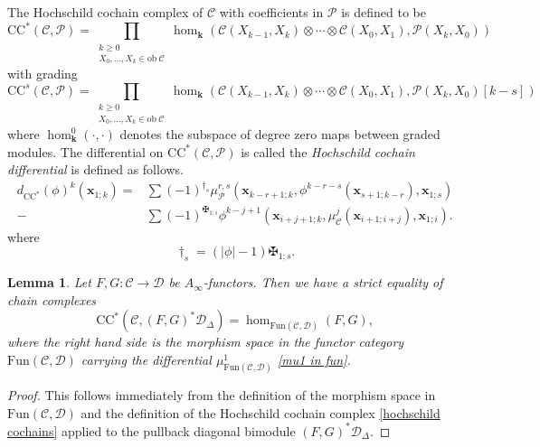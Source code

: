 \documentclass[11pt]{amsproc}
\def\K{{\mathbf{k}}}
\def\cP{\mathcal{P}}
\def\cc{\mathcal{C}}
\def\dd{\mathcal{D}}
\def\r#1{\mathrm{#1}}
\def\D{\Delta}
\def\ainf{A_\infty}
\def\ob{\mathrm{ob\ }}
\def\fun{\mathrm{Fun}}
\newtheorem{lem}{Lemma}[section]
\theoremstyle{remark}
\numberwithin{equation}{section}
\begin{document}
The Hochschild cochain complex of $\cc$ with coefficients in $\cP$ is defined to be
\begin{equation}\label{hochschild cochains}
\r{CC}^{*}(\cc, \cP) = \prod_{\substack{k \ge 0\\X_{0}, \ldots, X_{k} \in \ob \cc}} \hom_{\K}(\cc(X_{k-1}, X_{k}) \otimes \cdots \otimes \cc(X_{0}, X_{1}), \cP(X_{k}, X_{0}))
\end{equation}
with grading
\begin{equation}
\r{CC}^{s}(\cc, \cP) = \prod_{\substack{k \ge 0\\X_{0}, \ldots, X_{k} \in \ob \cc}} \hom_{\K}(\cc(X_{k-1}, X_{k}) \otimes \cdots \otimes \cc(X_{0}, X_{1}), \cP(X_{k}, X_{0})[k-s])
\end{equation}
where $\hom^{0}_{\K}(\cdot, \cdot)$ denotes the subspace of degree zero maps between graded modules.
The differential on $\r{CC}^{*}(\cc, \cP)$ is called the {\it Hochschild cochain differential} is defined as follows.
\begin{equation}\label{hochschild cochain differential}
\begin{split}
d_{\r{CC}^{*}}(\phi)^{k}(\mathbf{x}_{1; k}) = & \sum (-1)^{\dagger_{s}} \mu_{\cP}^{r, s}(\mathbf{x}_{k-r+1; k}, \phi^{k-r-s}(\mathbf{x}_{s+1; k-r}), \mathbf{x}_{1;s}) \\
- & \sum (-1)^{\maltese_{1;i}} \phi^{k-j+1}(\mathbf{x}_{i+j+1; k}, \mu_{\cc}^{j}(\mathbf{x}_{i+1; i+j}), \mathbf{x}_{1; i}).
\end{split}
\end{equation}
where 
\begin{equation}
\dagger_{s} = (|\phi|-1)\maltese_{1; s}.
\end{equation}

\begin{lem}\label{lem: cc computes hom in fun}
Let $F, G: \cc \to \dd$ be $\ainf$-functors. Then we have a strict equality of chain complexes
\begin{equation}
\r{CC}^{*}(\cc, (F, G)^{*}\dd_{\D}) = \hom_{\fun(\cc, \dd)}(F, G),
\end{equation}
where the right hand side is the morphism space in the functor category $\fun(\cc, \dd)$ carrying the differential $\mu^{1}_{\fun(\cc, \dd)}$ \eqref{mu1 in fun}.
\end{lem}
\begin{proof}
This follows immediately from the definition of the morphism space in $\fun(\cc, \dd)$ and the definition of the Hochschild cochain complex \eqref{hochschild cochains} applied to the pullback diagonal bimodule $(F, G)^{*}\dd_{\D}$.
\end{proof}
\end{document}
